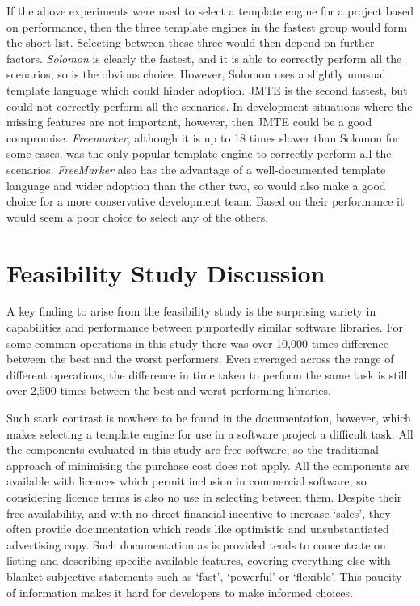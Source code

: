 If the above experiments were used to select a template engine for a project based on performance, then the three template engines in the fastest group would form the short-list. Selecting between these three would then depend on further factors. \emph{Solomon} is clearly the fastest, and it is able to correctly perform all the scenarios, so is the obvious choice. However, Solomon uses a slightly unusual template language which could hinder adoption. JMTE is the second fastest, but could not correctly perform all the scenarios. In development situations where the missing features are not important, however, then JMTE could be a good compromise. \emph{Freemarker}, although it is up to 18 times slower than Solomon for some cases, was the only popular template engine to correctly perform all the scenarios. \emph{FreeMarker} also has the advantage of a well-documented template language and wider adoption than the other two, so would also make a good choice for a more conservative development team. Based on their performance it would seem a poor choice to select any of the others.

\section{Feasibility Study Discussion}
\label{fs:discussion}

A key finding to arise from the feasibility study is the surprising variety in capabilities and performance between purportedly similar software libraries. For some common operations in this study there was over 10,000 times difference between the best and the worst performers. Even averaged across the range of different operations, the difference in time taken to perform the same task is still over 2,500 times between the best and worst performing libraries.

Such stark contrast is nowhere to be found in the documentation, however, which makes selecting a template engine for use in a software project a difficult task. All the components evaluated in this study are free software, so the traditional approach of minimising the purchase cost does not apply. All the components are available with licences which permit inclusion in commercial software, so considering licence terms is also no use in selecting between them. Despite their free availability, and with no direct financial incentive to increase `sales', they often provide documentation which reads like optimistic and unsubstantiated advertising copy. Such documentation as is provided tends to concentrate on listing and describing specific available features, covering everything else with blanket subjective statements such as `fast', `powerful' or `flexible'. This paucity of information makes it hard for developers to make informed choices.

